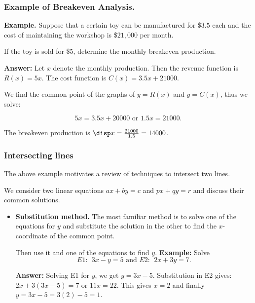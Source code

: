\begin{frame}%
  \frametitle{Example of Breakeven Analysis.}
   
    {\bf Example.} Suppose that a certain toy can be manufactured for \$$3.5$ each and 
    the cost of maintaining the workshop is \$$21,000$ per month.
    
    If the toy is sold for \$$5$, determine the monthly breakeven production.
    
    
  {\bf Answer:}
  Let $x$ denote the monthly production.
  Then the revenue function is $R(x)=5x$.
  The cost function is $C(x)=3.5x+21000$.
  
  We find the common point of the graphs of $y=R(x)$ and $y=C(x)$, thus we solve:
  
  $$5x=3.5x+20000 \mbox{ or } 1.5x = 21000.$$
  
  The breakeven production is $\disp x=\frac{21000}{1.5} = 14000$.
  
  
\end{frame}


\begin{frame}
  \frametitle{Intersecting lines}
The above example motivates a review of techniques to intersect two lines. 

We consider two linear equations $ax+by=c$ and $px+qy=r$ and discuss their common solutions.
 \begin{itemize}%
 \item {\bf Substitution method.} 
The most familiar method is to solve one of the equations for $y$ and substitute 
the solution in the other  to find the $x$-coordinate of the common point.

Then use it and one of the equations to find $y$.
{\bf Example:} Solve
$$E1:~~3x-y=5 \mbox{ and } E2:~~ 2x+3y = 7.$$

{\bf Answer:} 
Solving E1 for $y$, we get $y=3x-5$.
Substitution in E2 gives: $2x+3(3x-5)=7$ or $11x = 22$.
This gives $x=2$
 and finally  $y=3x-5 = 3(2)-5 = 1$. 

\end{itemize}
  
\end{frame}




